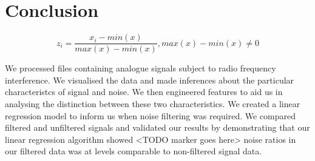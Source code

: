 \section{Conclusion}

$$ z{_i}=\frac{x{_i}-min(x)}{max(x)-min(x)} ,max(x)-min(x) \neq 0 $$

We processed files containing analogue signals subject to radio frequency interference. We visualised the data and made inferences about the particular characteristcs of signal and noise. We then engineered features to aid us in analysing the distinction between these two characteristics. We created a linear regression model to inform us when noise filtering was required. We compared filtered and unfiltered signals and validated our results by demonstrating that our linear regression algorithm showed <TODO marker goes here> noise ratios in our filtered data was at levels comparable to non-filtered signal data.  